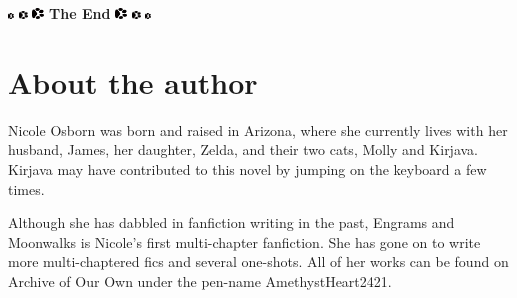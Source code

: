 \documentclass[12pt,twoside,openright]{memoir}
\begin{document}
\vspace*{\fill}
\begin{center}
	\HUGE
	\includegraphics[height=0.4em, angle=180, origin=c]{dogprint.pdf}\hspace{.2em}
	\includegraphics[height=0.6em, angle=180, origin=c]{dogprint.pdf}\hspace{.2em}
	\includegraphics[height=0.8em, angle=180, origin=c]{dogprint.pdf}\hspace{.2em}
	\textbf{The End}\hspace{.2em}
	\includegraphics[height=0.8em]{dogprint.pdf}\hspace{.2em}
	\includegraphics[height=0.6em]{dogprint.pdf}\hspace{.2em}
	\includegraphics[height=0.4em]{dogprint.pdf}
\end{center}

\backmatter

\chapter*{About the author}
Nicole Osborn was born and raised in Arizona, where she currently lives with her husband, James, her daughter, Zelda, and their two cats, Molly and Kirjava. Kirjava may have contributed to this novel by jumping on the keyboard a few times.

Although she has dabbled in fanfiction writing in the past, Engrams and Moonwalks is Nicole’s first multi-chapter fanfiction. She has gone on to write more multi-chaptered fics and several one-shots. All of her works can be found on Archive of Our Own under the pen-name AmethystHeart2421.

\pagebreak
\end{document}
